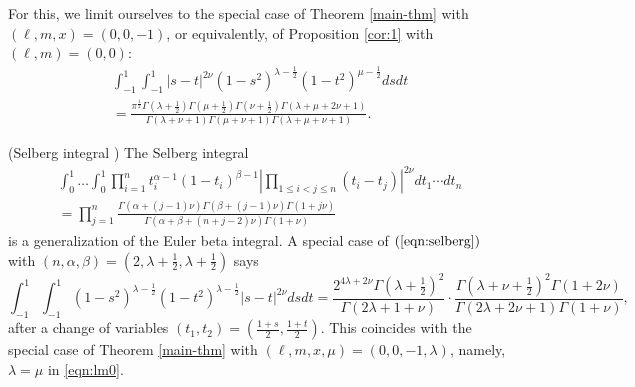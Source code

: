 \documentclass[12pt]{article}
\numberwithin{equation}{section}
\begin{document}
For this, we limit ourselves to the special case of Theorem \ref{main-thm}
with $(\ell, m, x) = (0, 0, -1)$, or equivalently, of Proposition \ref{cor:1}
with $(\ell, m) = (0, 0)$:
\begin{multline}  \label{eqn:lm0}
   \displaystyle\int_{- 1}^1 \displaystyle\int_{- 1}^1 | s - t |^{2 \nu} (1 - s^2)^{\lambda -
  \frac{1}{2}} (1 - t^2)^{\mu - \frac{1}{2}} d s d t \\
  = \frac{\pi^{\frac{1}{2}}
  \Gamma \left( \lambda + \frac{1}{2} \right) \Gamma \left( \mu + \frac{1}{2}
  \right) \Gamma \left( \nu + \frac{1}{2} \right) \Gamma (\lambda + \mu + 2
  \nu + 1)}{\Gamma (\lambda + \nu + 1) \Gamma (\mu + \nu + 1) \Gamma (\lambda
  + \mu + \nu + 1)} .
\end{multline}
\begin{example}
  \label{ex:1}(Selberg integral {\cite{Selberg:411367}}) The Selberg integral
  \begin{multline}
     \displaystyle\int_0^1 \ldots \displaystyle\int_0^1 \displaystyle\prod_{i = 1}^n t_i^{\alpha - 1} (1 -
    t_i)^{\beta - 1} \left| \displaystyle\prod_{1 \leqslant i < j \leqslant n} (t_i - t_j)
    \right|^{2 \nu} d t_1 \cdots d t_n    \\
     = \displaystyle\prod_{j = 1}^n \frac{\Gamma (\alpha + (j - 1) \nu) \Gamma (\beta +
    (j - 1) \nu) \Gamma (1 + j \nu)}{\Gamma (\alpha + \beta + (n + j - 2) \nu)
    \Gamma (1 + \nu)}   
	 \label{eqn:selberg} 
  \end{multline}
  is a generalization of the Euler beta integral. A special case of
  $(\ref{eqn:selberg})$ with $(n, \alpha, \beta) = \left( 2, \lambda +
  \frac{1}{2}, \lambda + \frac{1}{2} \right)$ says
  \begin{equation}
     \displaystyle\int_{- 1}^1 \displaystyle\int_{- 1}^1 (1 -
    s^2)^{\lambda - \frac{1}{2}} (1 - t^2)^{\lambda - \frac{1}{2}} | s - t
    |^{2 \nu} d s d t 
    = \displaystyle\frac{2^{4\lambda+2\nu}\Gamma \left( \lambda + \frac{1}{2} \right)^2}{\Gamma (2
    \lambda + 1 + \nu)} \cdot \frac{\Gamma \left( \lambda + \nu + \frac{1}{2}
    \right)^2 \Gamma (1 + 2 \nu)}{\Gamma (2 \lambda + 2 \nu + 1) \Gamma (1 +
    \nu)},
    \label{eqn:spec_selberg}
  \end{equation}
  after a change of variables $(t_1, t_2) = \left( \frac{1 + s}{2}, \frac{1 +
  t}{2} \right)$. This coincides with the special case of Theorem
  \ref{main-thm} with $(\ell,m,x,\mu)=(0,0,-1,\lambda)$, namely, $\lambda=\mu$ in 
  \eqref{eqn:lm0}.
\end{example}
\end{document}
